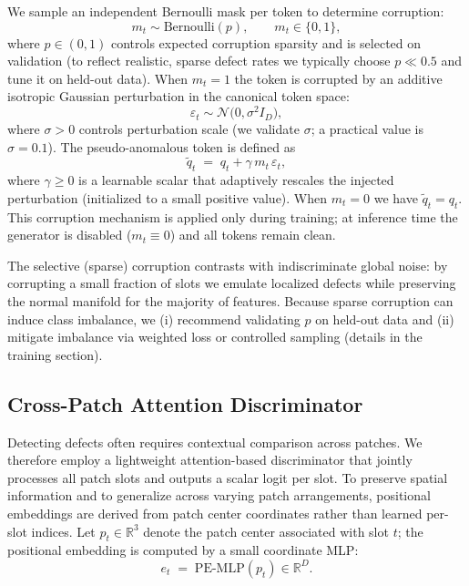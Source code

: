We sample an independent Bernoulli mask per token to determine corruption:
\begin{equation}
m_t \sim \mathrm{Bernoulli}(p),\qquad m_t\in\{0,1\},
\end{equation}
where \(p\in(0,1)\) controls expected corruption sparsity and is selected on validation (to reflect realistic, sparse defect rates we typically choose \(p\ll 0.5\) and tune it on held-out data). When \(m_t=1\) the token is corrupted by an additive isotropic Gaussian perturbation in the canonical token space:
\begin{equation}
\varepsilon_t \sim \mathcal{N}\big(0,\sigma^2 I_D\big),
\end{equation}
where \(\sigma>0\) controls perturbation scale (we validate \(\sigma\); a practical value is \(\sigma=0.1\)). The pseudo-anomalous token is defined as
\begin{equation}
\tilde{q}_t \;=\; q_t + \gamma\, m_t\, \varepsilon_t,
\end{equation}
where \(\gamma\ge 0\) is a learnable scalar that adaptively rescales the injected perturbation (initialized to a small positive value). When \(m_t=0\) we have \(\tilde{q}_t=q_t\). This corruption mechanism is applied only during training; at inference time the generator is disabled (\(m_t\equiv 0\)) and all tokens remain clean.

The selective (sparse) corruption contrasts with indiscriminate global noise: by corrupting a small fraction of slots we emulate localized defects while preserving the normal manifold for the majority of features. Because sparse corruption can induce class imbalance, we (i) recommend validating \(p\) on held-out data and (ii) mitigate imbalance via weighted loss or controlled sampling (details in the training section).

\subsection{Cross-Patch Attention Discriminator}
Detecting defects often requires contextual comparison across patches. We therefore employ a lightweight attention-based discriminator that jointly processes all patch slots and outputs a scalar logit per slot. To preserve spatial information and to generalize across varying patch arrangements, positional embeddings are derived from patch center coordinates rather than learned per-slot indices. Let \(p_t\in\mathbb{R}^3\) denote the patch center associated with slot \(t\); the positional embedding is computed by a small coordinate MLP:
\begin{equation}
e_t \;=\; \mathrm{PE\text{-}MLP}(p_t) \in\mathbb{R}^D.
\end{equation}

